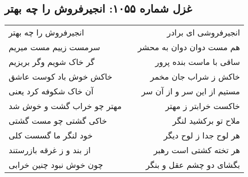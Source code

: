 \begin{center}
\section*{غزل شماره ۱۰۵۵: انجیرفروش را چه بهتر}
\label{sec:1055}
\begin{longtable}{l p{0.5cm} r}
انجیرفروش را چه بهتر
&&
انجیرفروشی ای برادر
\\
سرمست زییم مست میریم
&&
هم مست دوان دوان به محشر
\\
گر خاک شویم وگر بریزیم
&&
ساقی با ماست بنده پرور
\\
خاکش خوش باد کوست عاشق
&&
خاکش ز شراب جان مخمر
\\
آن خاک شکوفه کرد یعنی
&&
مستیم از این سر و از آن سر
\\
مهتر چو خراب گشت و خوش شد
&&
خاکست خرابتر ز مهتر
\\
خاکی گشتی چو مست گشتی
&&
ملاح تو برکشید لنگر
\\
خود لنگر ما گسست کلی
&&
هر لوح جدا ز لوح دیگر
\\
از بند و ز غرقه بازرستند
&&
هر تخته کشتی است رهبر
\\
چون خوش نبود چنین خرابی
&&
بگشای دو چشم عقل و بنگر
\\
\end{longtable}
\end{center}
